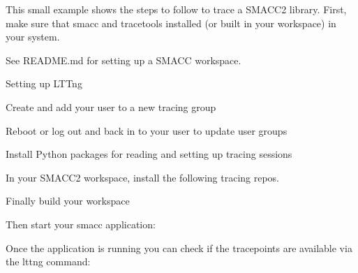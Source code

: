 This small example shows the steps to follow to trace a SMACC2 library. First, make sure that smacc and tracetools installed (or built in your workspace) in your system.

See README.\+md for setting up a SMACC workspace.

Setting up LTTng


\begin{DoxyCode}{0}

\end{DoxyCode}


Create and add your user to a new tracing group


\begin{DoxyCode}{0}

\end{DoxyCode}
 Reboot or log out and back in to your user to update user groups


\begin{DoxyCode}{0}

\end{DoxyCode}
 Install Python packages for reading and setting up tracing sessions


\begin{DoxyCode}{0}

\end{DoxyCode}
 In your SMACC2 workspace, install the following tracing repos.


\begin{DoxyCode}{0}

\end{DoxyCode}
 Finally build your workspace


\begin{DoxyCode}{0}

\end{DoxyCode}
 Then start your smacc application\+:


\begin{DoxyCode}{0}

\end{DoxyCode}
 Once the application is running you can check if the tracepoints are available via the lttng command\+:



